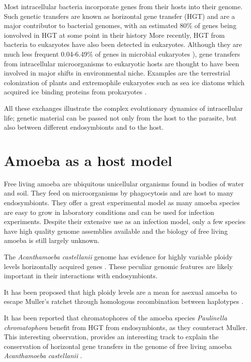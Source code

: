 Most intracellular bacteria incorporate genes from their hosts into their genome. Such genetic transfers are known as horizontal gene transfer (HGT) and are a major contributor to bacterial genomes, with an estimated 80\% of genes being ionvolved in HGT at some point in their history \cite{Dagan2008} More recently, HGT from bacteria to eukaryotes have also been detected in eukaryotes. Although they are much less frequent 0.04-6.49\% of genes in microbial eukaryotes \cite{VanEtten2020}), gene transfers from intracellular microorganisms to eukaryotic hosts are thought to have been involved in major shifts in environmental niche. Examples are the terrestrial colonization of plants and extremophile eukaryotes such as sea ice diatoms which acquired ice binding proteins from prokaryotes \cite{VanEtten2020}.

All these exchanges illustrate the complex evolutionary dynamics of intracellular life; genetic material can be passed not only from the host to the parasite, but also between different endosymbionts and to the host.

\section{Amoeba as a host model}

Free living amoeba are ubiquitous unicellular organisms found in bodies of water and soil. They feed on microorganisms by phagocytosis and are host to many endosymbionts. They offer a great experimental model as many amoeba species are easy to grow in laboratory conditions and can be used for infection experiments. Despite their extensive use as an infection model, only a few species have high quality genome assemblies available and the biology of free living amoeba is still largely unknown. 

The \textit{Acanthamoeba castellanii} genome has evidence for highly variable ploidy levels \cite{Maciver2016} horizontally acquired genes \cite{clarke2013}. These peculiar genomic features are likely important in their interactions with endosymbionts. 

It has been proposed that high ploidy levels are a mean for asexual amoeba to escape Muller's ratchet through homologous recombination between haplotypes \cite{Maciver2016}.

It has been reported that chromatophores of the amoeba species \textit{Paulinella chromatophora} benefit from HGT from endosymbionts, as they counteract \Gls{Muller}. This interesting observation, provides an interesting track to explain the conservation of horizontal gene transfers in the genome of free living amoeba \textit{Acanthamoeba castellanii} \cite{clarke2013}.

